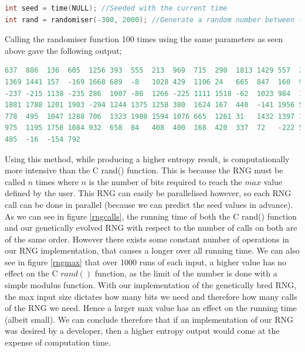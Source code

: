 \documentclass[a4paper,10.5pt]{article}
\begin{document}
\begin{lstlisting}[language=C, basicstyle=\small]
int seed = time(NULL); //Seeded with the current time
int rand = randomiser(-300, 2000); //Generate a random number between -300 and 2000
\end{lstlisting}
Calling the randomiser function 100 times using the same parameters as seen above gave the following output;

\begin{lstlisting}[language=C, basicstyle=\small]
637  886  136  605  1256 393  555  213  969  715  290  1813 1429 557  26   1317 
1369 1441 157  -169 1668 689  -8   1028 429  1106 24   665  847  160  940  -144
-237 -215 1138 -235 286  1007 -86  1266 -225 1111 1518 -62  1023 984  1218 1235
1881 1788 1201 1903 -294 1244 1375 1258 380  1624 167  440  -141 1956 557  -273
778  495  1047 1288 706  1323 1908 1594 1076 665  1261 31   1432 1397 166  279
975  1195 1758 1084 932  658  84   408  400  168  420  337  72   -222 561  -122
485  -16  -154 792

\end{lstlisting}
Using this method, while producing a higher entropy result, is computationally more intensive than the C rand() function. This is because the RNG must be called $n$ times where $n$ is the number of bits required to reach the $max$ value defined by the user. This RNG can easily be parallelised however, so each RNG call can be done in parallel (because we can predict the seed values in advance). As we can see in figure \ref{rngcalls}, the running time of both the C rand() function and our genetically evolved RNG with respect to the number of calls on both are of the same order. However there exists some constant number of operations in our RNG implementation, that causes a longer over all running time. We can also see in figure \ref{rngmax} that over 1000 runs of each input, a higher value has no effect on the C $rand()$ function, as the limit of the number is done with a simple modulus function. With our implementation of the genetically bred RNG, the max input size dictates how many bits we need and therefore how many calls of the RNG we need. Hence a larger max value has an effect on the running time (albeit small). We can conclude therefore that if an implementation of our RNG was desired by a developer, then a higher entropy output would come at the expense of computation time.
\end{document}
